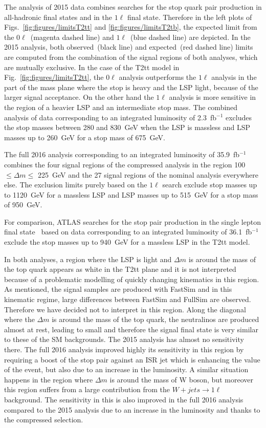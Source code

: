 The analysis of 2015 data combines searches for the stop quark pair production in all-hadronic final states and in the $1\ell$ final state. Therefore in the left plots of Figs.~\ref{fig:figures/limitsT2tt} and \ref{fig:figures/limitsT2tb}, the expected limit from the $0\ell$~(magenta dashed line) and $1\ell$~(blue dashed line) are depicted. In the 2015 analysis, both observed~(black line) and expected~(red dashed line) limits are computed from the combination of the signal regions of both analyses, which are mutually exclusive. In the case of the T2tt model in Fig.~\ref{fig:figures/limitsT2tt}, the  $0\ell$ analysis outperforms the $1\ell$ analysis in the part of the mass plane where the stop is heavy and the LSP light, because of the larger signal acceptance. On the other hand the $1\ell$ analysis is more sensitive in the region of a heavier LSP and an intermediate stop mass. The combined analysis of data corresponding to an integrated luminosity of 2.3~fb$^{-1}$ excludes the stop masses between 280 and 830~GeV when the LSP is massless and LSP masses up to 260~GeV for a stop mass of 675~GeV. 

The full 2016 analysis corresponding to an integrated luminosity of 35.9~fb$^{-1}$ combines the four signal regions of the compressed analysis in the region 100 $\leq \Delta m \leq $ 225~GeV and the 27 signal regions of the nominal analysis everywhere else. The exclusion limits purely based on the $1\ell$ search exclude  stop masses up to 1120~GeV for a massless LSP and LSP masses up to 515~GeV for a stop mass of 950~GeV. 


For comparison, ATLAS searches for the stop pair production in the single lepton final state~\cite{Aaboud:2017aeu} based on data corresponding to an integrated luminosity of 36.1~fb$^{-1}$ exclude the stop masses up to 940~GeV for a massless LSP in the T2tt model. 

In both analyses, a region where the LSP is light and $\Delta m$ is around the mass of the top quark appears as white in the T2tt plane and it is not interpreted because of a problematic modelling of quickly changing kinematics in this region. As mentioned, the signal samples are produced with FastSim and in this kinematic regime, large differences between FastSim and FullSim are observed. Therefore we have decided not to interpret in this region. Along the diagonal where the $\Delta m$ is around the mass of the top quark, the neutralinos are produced almost at rest, leading to  small \MET and therefore the signal final state is very similar to these of the SM backgrounds. The 2015 analysis has almost no sensitivity there. The full 2016 analysis improved highly its sensitivity in this region by requiring a boost of the stop pair against an ISR jet which is enhancing the \MET value of the event, but also due to an increase in the luminosity. A similar situation happens in the region where $\Delta m$ is around the mass of W boson, but moreover this region suffers from a  large contribution from the $W+jets \to 1\ell$ background. The sensitivity in this is also improved in the full 2016 analysis compared to the 2015 analysis due to an increase in the luminosity and  thanks to the compressed selection. 

